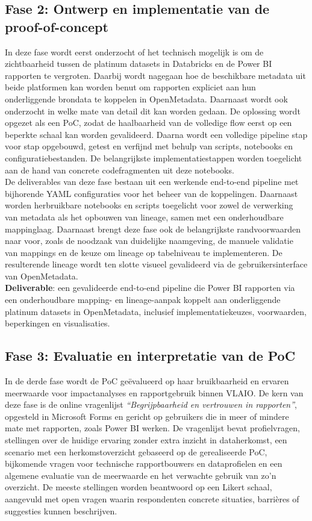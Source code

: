\subsection{Fase 2: Ontwerp en implementatie van de proof-of-concept}

In deze fase wordt eerst onderzocht of het technisch mogelijk is om de zichtbaarheid tussen de platinum datasets in Databricks en de Power BI rapporten te vergroten. Daarbij wordt nagegaan hoe de beschikbare metadata uit beide platformen kan worden benut om rapporten expliciet aan hun onderliggende brondata te koppelen in OpenMetadata. Daarnaast wordt ook onderzocht in welke mate van detail dit kan worden gedaan. De oplossing wordt opgezet als een PoC, zodat de haalbaarheid van de volledige flow eerst op een beperkte schaal kan worden gevalideerd. Daarna wordt een volledige pipeline stap voor stap opgebouwd, getest en verfijnd met behulp van scripts, notebooks en configuratiebestanden. De belangrijkste implementatiestappen worden toegelicht aan de hand van concrete codefragmenten uit deze notebooks.\\

De deliverables van deze fase bestaan uit een werkende end-to-end pipeline met bijhorende YAML configuraties voor het beheer van de koppelingen. Daarnaast worden herbruikbare notebooks en scripts toegelicht voor zowel de verwerking van metadata als het opbouwen van lineage, samen met een onderhoudbare mappinglaag. Daarnaast brengt deze fase ook de belangrijkste randvoorwaarden naar voor, zoals de noodzaak van duidelijke naamgeving, de manuele validatie van mappings en de keuze om lineage op tabelniveau te implementeren. De resulterende lineage wordt ten slotte visueel gevalideerd via de gebruikersinterface van OpenMetadata.\\

\textbf{Deliverable}: een gevalideerde end-to-end pipeline die Power BI rapporten via een onderhoudbare mapping- en lineage-aanpak koppelt aan onderliggende platinum datasets in OpenMetadata, inclusief implementatiekeuzes, voorwaarden, beperkingen en visualisaties.

\subsection{Fase 3: Evaluatie en interpretatie van de PoC}

In de derde fase wordt de PoC geëvalueerd op haar bruikbaarheid en ervaren meerwaarde voor impactanalyses en rapportgebruik binnen VLAIO. De kern van deze fase is de online vragenlijst \emph{``Begrijpbaarheid en vertrouwen in rapporten''}, opgesteld in Microsoft Forms en gericht op gebruikers die in meer of mindere mate met rapporten, zoals Power BI werken. De vragenlijst bevat profielvragen, stellingen over de huidige ervaring zonder extra inzicht in dataherkomst, een scenario met een herkomstoverzicht gebaseerd op de gerealiseerde PoC, bijkomende vragen voor technische rapportbouwers en dataprofielen en een algemene evaluatie van de meerwaarde en het verwachte gebruik van zo'n overzicht. De meeste stellingen worden beantwoord op een Likert schaal, aangevuld met open vragen waarin respondenten concrete situaties, barrières of suggesties kunnen beschrijven.\\

